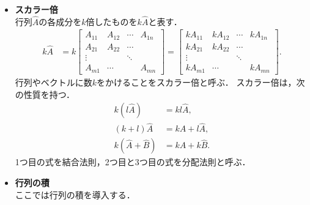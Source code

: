 \begin{itemize}
\begin{align}
\begin{array}{cccc}
A_{11}+B_{11} & A_{12}+B_{12} & \cdots & A_{1n}+B_{1n}\\
A_{21}+B_{21} & A_{22}+B_{22} & \cdots\\
\vdots &  & \ddots\\
A_{m1}+B_{m1} & \cdots &  & A_{mn}+B_{mn}
\end{array}\right]\notag\\
 & =\left[A_{ij}+B_{ij}\right]_{m\times n}. 
\end{align}
%
行列の和や差については，和をとる順序で結果は変わらない．
つまり，$\hat{A},~\hat{B},~\hat{C}$を同じ型の行列とすると次式が成り立つ(すぐに確認できる)．
\begin{align}
 \hat{A}+\hat{B} & =\hat{B}+\hat{A},\\
\hat{A}+\left(\hat{B}+\hat{C}\right) & =\left(\hat{A}+\hat{B}\right)+\hat{C},
\end{align}
%
\item \textbf{スカラー倍}\\
%
行列$\hat{A}$の各成分を$k$倍したものを$k\hat{A}$と表す．
\begin{align}
k\hat{A} & =k\left[\begin{array}{cccc}
A_{11} & A_{12} & \cdots & A_{1n}\\
A_{21} & A_{22} & \cdots\\
\vdots &  & \ddots\\
A_{m1} & \cdots &  & A_{mn}
\end{array}\right]=\left[\begin{array}{cccc}
kA_{11} & kA_{12} & \cdots & kA_{1n}\\
kA_{21} & kA_{22} & \cdots\\
\vdots &  & \ddots\\
kA_{m1} & \cdots &  & kA_{mn}
\end{array}\right].
\end{align}
行列やベクトルに数$k$をかけることをスカラー倍と呼ぶ．
スカラー倍は，次の性質を持つ．
\begin{align}
 k\left(l\hat{A}\right) & =kl\hat{A},\\
\left(k+l\right)\hat{A} & =k\hat{A}+l\hat{A},\\
k\left(\hat{A}+\hat{B}\right) & =k\hat{A}+k\hat{B}. 
\end{align}
1つ目の式を結合法則，2つ目と3つ目の式を分配法則と呼ぶ．
%
\item \textbf{行列の積}\\
%
ここでは行列の積を導入する．

\end{itemize}
